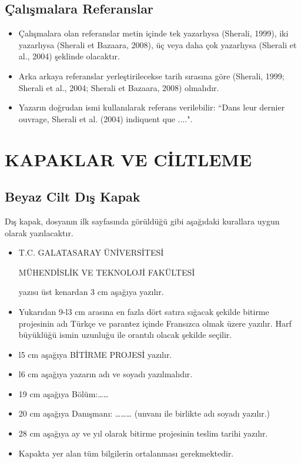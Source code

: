 \subsection{Çalışmalara Referanslar}
\begin{itemize}
\item Çalışmalara olan referanslar metin içinde tek yazarlıysa (Sherali, 1999), iki yazarlıysa (Sherali et Bazaara, 2008), üç veya daha çok yazarlıysa (Sherali et al., 2004) şeklinde olacaktır.
\item Arka arkaya referanslar yerleştirilecekse tarih sırasına göre (Sherali, 1999; Sherali et al., 2004; Sherali et Bazaara, 2008) olmalıdır.
\item Yazarın doğrudan ismi kullanılarak referans verilebilir: ``Dans leur dernier ouvrage, Sherali et al. (2004) indiquent que ....".
\end{itemize}

\section{KAPAKLAR VE CİLTLEME}
\subsection{Beyaz Cilt Dış Kapak}
Dış kapak, dosyanın ilk sayfasında görüldüğü gibi aşağıdaki kurallara uygun olarak yazılacaktır.
\begin{itemize}
\item T.C. GALATASARAY ÜNİVERSİTESİ 

MÜHENDİSLİK VE TEKNOLOJİ FAKÜLTESİ 

yazısı üst kenardan 3 cm aşağıya yazılır.
\item Yukarıdan 9-l3 cm arasına en fazla dört satıra sığacak şekilde bitirme projesinin adı  Türkçe ve parantez içinde Fransızca olmak üzere yazılır. Harf büyüklüğü ismin uzunluğu ile orantılı olacak şekilde seçilir.
\item l5 cm aşağıya BİTİRME PROJESİ yazılır.
\item l6 cm aşağıya yazarın adı ve soyadı yazılmalıdır.
\item 19 cm aşağıya Bölüm:…… 
\item 20 cm aşağıya Danışmanı: ……… (unvanı ile birlikte adı soyadı yazılır.)
\item 28 cm aşağıya ay ve yıl olarak bitirme projesinin teslim tarihi yazılır.
\item Kapakta yer alan tüm bilgilerin ortalanması gerekmektedir.
\end{itemize}

